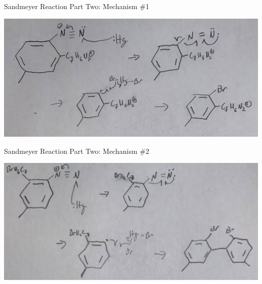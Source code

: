 \documentclass[notes]{beamer}
\begin{document}
\begin{frame}{Sandmeyer Reaction Part Two: Mechanism \#1}

\begin{center}
    \includegraphics[scale = .39]{sandmeyer_part_two_one.JPG}
\end{center}
    
    \note{\begin{itemize}
    \item 
\end{itemize}}

\end{frame}

\begin{frame}{Sandmeyer Reaction Part Two: Mechanism \#2}

\begin{center}
    \includegraphics[scale = .382]{sandmeyer_part_two_two.JPG}
\end{center}
    
    \note{\begin{itemize}
    \item 
\end{itemize}}

\end{frame}
\end{document}
